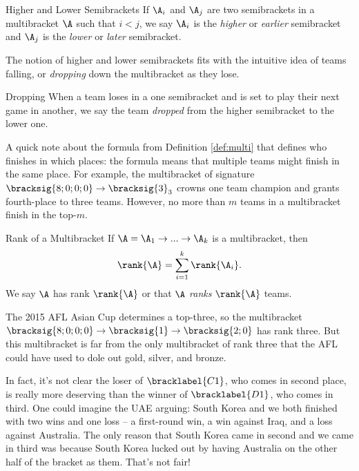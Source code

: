 {    \begin{definition}{Higher and Lower Semibrackets}{}
        If $\A_i$ and $\A_j$ are two semibrackets in a multibracket $\A$ such that $i < j$, we say $\A_i$ is the \textit{higher} or \textit{earlier} semibracket and $\A_j$ is the \textit{lower} or \textit{later} semibracket.
    \end{definition}

    The notion of higher and lower semibrackets fits with the intuitive idea of teams falling, or \textit{dropping} down the multibracket as they lose.
    
    \begin{definition}{Dropping}{}
        When a team loses in a one semibracket and is set to play their next game in another, we say the team \textit{dropped} from the higher semibracket to the lower one.
    \end{definition}

    A quick note about the formula from Definition \ref{def:multi} that defines who finishes in which places: the formula means that multiple teams might finish in the same place. For example, the multibracket of signature $\bracksig{8;0;0;0} \to \bracksig{3}_3$ crowns one team champion and grants fourth-place to three teams. However, no more than $m$ teams in a multibracket finish in the top-$m$.

    \begin{definition}{Rank of a Multibracket}{}
        If $\A = \A_1 \to ... \to \A_k$ is a multibracket, then $$\rank{\A} = \sum_{i=1}^k \rank{\A_i}.$$ We say $\A$ has rank $\rank{\A}$ or that $\A$ \textit{ranks} $\rank{\A}$ teams.
    \end{definition}

    The 2015 AFL Asian Cup determines a top-three, so the multibracket $\bracksig{8;0;0;0} \to \bracksig{1} \to \bracksig{2;0}$ has rank three. But this multibracket is far from the only multibracket of rank three that the AFL could have used to dole out gold, silver, and bronze.
    
    In fact, it's not clear the loser of $\bracklabel{C1}$, who comes in second place, is really more deserving than the winner of $\bracklabel{D1}$, who comes in third. One could imagine the UAE arguing: South Korea and we both finished with two wins and one loss -- a first-round win, a win against Iraq, and a loss against Australia. The only reason that South Korea came in second and we came in third was because South Korea lucked out by having Australia on the other half of the bracket as them. That's not fair!

}
